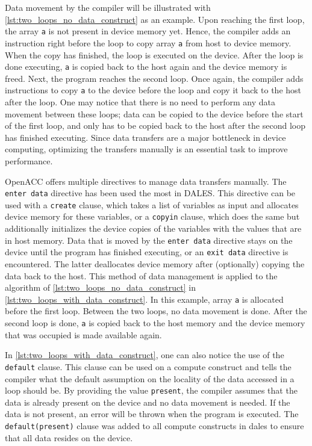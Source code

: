 Data movement by the compiler will be illustrated with \autoref{lst:two_loops_no_data_construct} as an example. Upon reaching the first loop, the array \texttt{a} is not present in device memory yet. Hence, the compiler adds an instruction right before the loop to copy array \texttt{a} from host to device memory. When the copy has finished, the loop is executed on the device. After the loop is done executing, \texttt{a} is copied back to the host again and the device memory is freed. Next, the program reaches the second loop. Once again, the compiler adds instructions to copy \texttt{a} to the device before the loop and copy it back to the host after the loop. One may notice that there is no need to perform any data movement between these loops; data can be copied to the device before the start of the first loop, and only has to be copied back to the host after the second loop has finished executing. Since data transfers are a major bottleneck in device computing, optimizing the transfers manually is an essential task to improve performance. 

OpenACC offers multiple directives to manage data transfers manually. The \texttt{enter data} directive has been used the most in DALES. This directive can be used with a \texttt{create} clause, which takes a list of variables as input and allocates device memory for these variables, or a \texttt{copyin} clause, which does the same but additionally initializes the device copies of the variables with the values that are in host memory. Data that is moved by the \texttt{enter data} directive stays on the device until the program has finished executing, or an \texttt{exit data} directive is encountered. The latter deallocates device memory after (optionally) copying the data back to the host. This method of data management is applied to the algorithm of \autoref{lst:two_loops_no_data_construct} in \autoref{lst:two_loops_with_data_construct}. In this example, array \texttt{a} is allocated before the first loop. Between the two loops, no data movement is done. After the second loop is done, \texttt{a} is copied back to the host memory and the device memory that was occupied is made available again.

In \autoref{lst:two_loops_with_data_construct}, one can also notice the use of the \texttt{default} clause. This clause can be used on a compute construct and tells the compiler what the default assumption on the locality of the data accessed in a loop should be. By providing the value \texttt{present}, the compiler assumes that the data is already present on the device and no data movement is needed. If the data is not present, an error will be thrown when the program is executed. The \texttt{default(present)} clause was added to all compute constructs in \acrshort{dales} to ensure that all data resides on the device.


